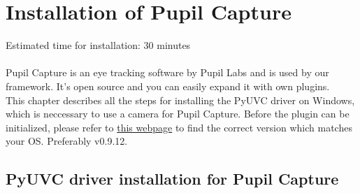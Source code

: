 \documentclass[../../Installationguide_Unity_Pupil]{subfiles}
\begin{document}
\chapter{Installation of Pupil Capture}
Estimated time for installation: 30 minutes\\
$~$\\
Pupil Capture is an eye tracking software by Pupil Labs and is used by our framework. It's open source and you can easily expand it with own plugins. \\
This chapter describes all the steps for installing the PyUVC driver on Windows, which is neccessary to use a camera for Pupil Capture.
Before the plugin can be initialized, please refer to \href{https://github.com/pupil-labs/pupil/releases }{this webpage} to find the correct version which matches your OS. Preferably v0.9.12.
\section{PyUVC driver installation for  Pupil Capture}
\end{document}
